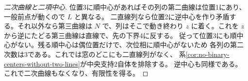 \begin{proof}[二次曲線と二項中心]
位置3に順中心があればその列の第二曲線は位置1にあり、一般前点が動くので $L$ と異なる。
二直線列なら位置2に逆中心を作り矛盾する。それ以外なら第三曲線は $N$ で、列はそこで動き終わり
$z$ に着く。これを $z$ から逆にたどる第三曲線は直線で、先の下界4に反する。
従って位置3にも順中心がない。残る順中心は偶位置だけで、次位相に順中心がないため
各列の第二次数は3である。これでは窓のどこにも二直線列がなく、
系\ref{cor:no-binary-centers-without-two-lines}が中央支持2自体を排除する。
逆中心も同様である。これで二次曲線もなくなり、有限性を得る。
\end{proof}
